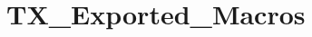 \hypertarget{group___t_x___exported___macros}{}\section{T\+X\+\_\+\+Exported\+\_\+\+Macros}
\label{group___t_x___exported___macros}
